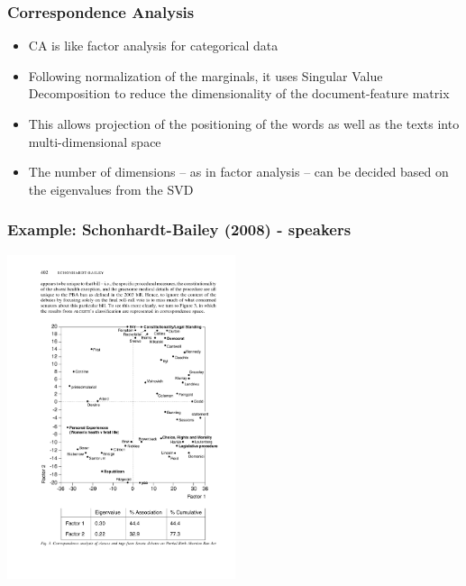 \documentclass{beamer}
\begin{document}
\begin{frame}
	\frametitle{Correspondence Analysis}  
	\begin{itemize}
		\item CA is like factor analysis for categorical data
		\item Following normalization of the marginals, it uses Singular
		Value Decomposition to reduce the dimensionality of the
		document-feature matrix
		\item This allows projection of the positioning of the words as well
		as the texts into multi-dimensional space
		\item The number of dimensions -- as in factor analysis -- can be
		decided based on the eigenvalues from the SVD
	\end{itemize}
\end{frame}


\begin{frame}
	\frametitle{Example: Schonhardt-Bailey (2008) - speakers}
	\begin{center}
		\includegraphics[width=6.7cm]{figures/SBca.pdf}
	\end{center}
\end{frame}
\end{document}

